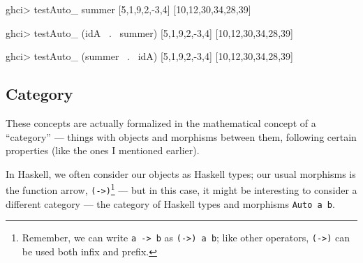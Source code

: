 \documentclass[]{article}
\newenvironment{Shaded}{}{}
\newcommand{\DecValTok}[1]{\textcolor[rgb]{0.25,0.63,0.44}{{#1}}}
\newcommand{\FunctionTok}[1]{\textcolor[rgb]{0.02,0.16,0.49}{{#1}}}
\newcommand{\NormalTok}[1]{{#1}}
\begin{document}
\begin{Shaded}
\begin{Highlighting}[]
\NormalTok{ghci}\FunctionTok{>} \NormalTok{testAuto_ summer [}\DecValTok{5}\NormalTok{,}\DecValTok{1}\NormalTok{,}\DecValTok{9}\NormalTok{,}\DecValTok{2}\NormalTok{,}\FunctionTok{-}\DecValTok{3}\NormalTok{,}\DecValTok{4}\NormalTok{]}
\NormalTok{[}\DecValTok{10}\NormalTok{,}\DecValTok{12}\NormalTok{,}\DecValTok{30}\NormalTok{,}\DecValTok{34}\NormalTok{,}\DecValTok{28}\NormalTok{,}\DecValTok{39}\NormalTok{]}

\NormalTok{ghci}\FunctionTok{>} \NormalTok{testAuto_ (idA }\FunctionTok{~.~} \NormalTok{summer) [}\DecValTok{5}\NormalTok{,}\DecValTok{1}\NormalTok{,}\DecValTok{9}\NormalTok{,}\DecValTok{2}\NormalTok{,}\FunctionTok{-}\DecValTok{3}\NormalTok{,}\DecValTok{4}\NormalTok{]}
\NormalTok{[}\DecValTok{10}\NormalTok{,}\DecValTok{12}\NormalTok{,}\DecValTok{30}\NormalTok{,}\DecValTok{34}\NormalTok{,}\DecValTok{28}\NormalTok{,}\DecValTok{39}\NormalTok{]}

\NormalTok{ghci}\FunctionTok{>} \NormalTok{testAuto_ (summer }\FunctionTok{~.~} \NormalTok{idA) [}\DecValTok{5}\NormalTok{,}\DecValTok{1}\NormalTok{,}\DecValTok{9}\NormalTok{,}\DecValTok{2}\NormalTok{,}\FunctionTok{-}\DecValTok{3}\NormalTok{,}\DecValTok{4}\NormalTok{]}
\NormalTok{[}\DecValTok{10}\NormalTok{,}\DecValTok{12}\NormalTok{,}\DecValTok{30}\NormalTok{,}\DecValTok{34}\NormalTok{,}\DecValTok{28}\NormalTok{,}\DecValTok{39}\NormalTok{]}
\end{Highlighting}
\end{Shaded}

\subsection{Category}\label{category}

These concepts are actually formalized in the mathematical concept of a
``category'' --- things with objects and morphisms between them, following
certain properties (like the ones I mentioned earlier).

In Haskell, we often consider our objects as Haskell types; our usual morphisms
is the function arrow, \texttt{(-\textgreater{})}\footnote{Remember, we can
  write \texttt{a\ -\textgreater{}\ b} as \texttt{(-\textgreater{})\ a\ b}; like
  other operators, \texttt{(-\textgreater{})} can be used both infix and prefix.}
--- but in this case, it might be interesting to consider a different category
--- the category of Haskell types and morphisms \texttt{Auto\ a\ b}.
\end{document}
